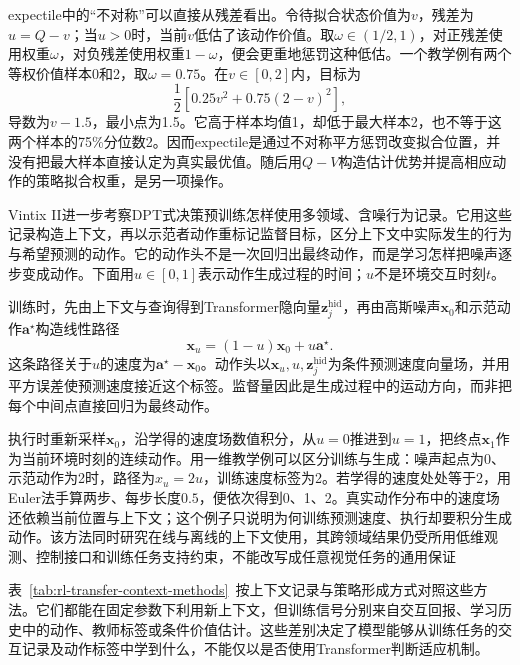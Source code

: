 expectile中的“不对称”可以直接从残差看出。令待拟合状态价值为$v$，残差为$u=Q-v$；当$u>0$时，当前$v$低估了该动作价值。取$\omega\in(1/2,1)$，对正残差使用权重$\omega$，对负残差使用权重$1-\omega$，便会更重地惩罚这种低估。一个教学例有两个等权价值样本0和2，取$\omega=0.75$。在$v\in[0,2]$内，目标为
\[
  \frac12\left[0.25v^2+0.75(2-v)^2\right],
\]
导数为$v-1.5$，最小点为1.5。它高于样本均值1，却低于最大样本2，也不等于这两个样本的75\%分位数2。因而expectile是通过不对称平方惩罚改变拟合位置，并没有把最大样本直接认定为真实最优值。随后用$Q-V$构造估计优势并提高相应动作的策略拟合权重，是另一项操作。

Vintix II进一步考察DPT式决策预训练怎样使用多领域、含噪行为记录。它用这些记录构造上下文，再以示范者动作重标记监督目标，区分上下文中实际发生的行为与希望预测的动作。它的动作头不是一次回归出最终动作，而是学习怎样把噪声逐步变成动作。下面用$u\in[0,1]$表示动作生成过程的时间；$u$不是环境交互时刻$t$。

训练时，先由上下文与查询得到Transformer隐向量$\bm z_j^{\mathrm{hid}}$，再由高斯噪声$\bm x_0$和示范动作$\bm a^\star$构造线性路径
\[
  \bm x_u=(1-u)\bm x_0+u\bm a^\star.
\]
这条路径关于$u$的速度为$\bm a^\star-\bm x_0$。动作头以$\bm x_u,u,\bm z_j^{\mathrm{hid}}$为条件预测速度向量场，并用平方误差使预测速度接近这个标签。监督量因此是生成过程中的运动方向，而非把每个中间点直接回归为最终动作。

\begin{samepage}
执行时重新采样$\bm x_0$，沿学得的速度场数值积分，从$u=0$推进到$u=1$，把终点$\bm x_1$作为当前环境时刻的连续动作。用一维教学例可以区分训练与生成：噪声起点为0、示范动作为2时，路径为$x_u=2u$，训练速度标签为2。若学得的速度处处等于2，用Euler法手算两步、每步长度$0.5$，便依次得到0、1、2。真实动作分布中的速度场还依赖当前位置与上下文；这个例子只说明为何训练预测速度、执行却要积分生成动作。该方法同时研究在线与离线的上下文使用，其跨领域结果仍受所用低维观测、控制接口和训练任务支持约束，不能改写成任意视觉任务的通用保证
\par
\end{samepage}

表~\ref{tab:rl-transfer-context-methods}~按上下文记录与策略形成方式对照这些方法。它们都能在固定参数下利用新上下文，但训练信号分别来自交互回报、学习历史中的动作、教师标签或条件价值估计。这些差别决定了模型能够从训练任务的交互记录及动作标签中学到什么，不能仅以是否使用Transformer判断适应机制。

